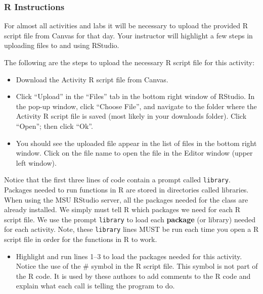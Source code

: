 \documentclass[
]{report}
\providecommand{\tightlist}{%
  \setlength{\itemsep}{0pt}\setlength{\parskip}{0pt}}
\begin{document}
\vspace{0.8in}

\subsubsection*{R Instructions}\label{r-instructions}

For almost all activities and labs it will be necessary to upload the provided R script file from Canvas for that day. Your instructor will highlight a few steps in uploading files to and using RStudio.

The following are the steps to upload the necessary R script file for this activity:

\begin{itemize}
\item
  Download the Activity R script file from Canvas.
\item
  Click ``Upload'' in the ``Files'' tab in the bottom right window of RStudio. In the pop-up window, click ``Choose File'', and navigate to the folder where the Activity R script file is saved (most likely in your downloads folder). Click ``Open''; then click ``Ok''.
\item
  You should see the uploaded file appear in the list of files in the bottom right window. Click on the file name to open the file in the Editor window (upper left window).
\end{itemize}

Notice that the first three lines of code contain a prompt called \texttt{library}. Packages needed to run functions in R are stored in directories called libraries. When using the MSU RStudio server, all the packages needed for the class are already installed. We simply must tell R which packages we need for each R script file. We use the prompt \texttt{library} to load each \textbf{package} (or library) needed for each activity. Note, these \texttt{library} lines MUST be run each time you open a R script file in order for the functions in R to work.

\begin{itemize}
\tightlist
\item
  Highlight and run lines 1--3 to load the packages needed for this activity. Notice the use of the \# symbol in the R script file. This symbol is not part of the R code. It is used by these authors to add comments to the R code and explain what each call is telling the program to do.
\end{itemize}
\end{document}
